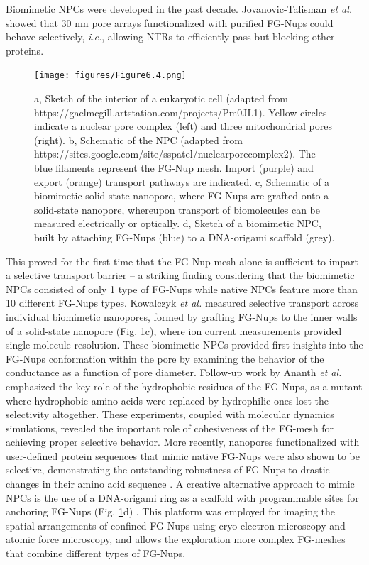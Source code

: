 Biomimetic NPCs were developed in the past decade. Jovanovic-Talisman \emph{et al.} \cite{Jovanovic-Talisman2009} showed that 30 nm pore arrays functionalized with purified FG-Nups could behave selectively, \emph{i.e.}, allowing NTRs to efficiently pass but blocking other proteins. 
\begin{figure}[!htbp]
	\centering
	\texttt{[image: figures/Figure6.4.png]}
	\caption{a, Sketch of the interior of a eukaryotic cell (adapted from https://gaelmcgill.artstation.com/projects/Pm0JL1). Yellow circles indicate a nuclear pore complex (left) and three mitochondrial pores (right). b, Schematic of the NPC (adapted from https://sites.google.com/site/sspatel/nuclearporecomplex2). The blue filaments represent the FG-Nup mesh. Import (purple) and export (orange) transport pathways are indicated. c, Schematic of a biomimetic solid-state nanopore, where FG-Nups are grafted onto a solid-state nanopore, whereupon transport of biomolecules can be measured electrically or optically. d, Sketch of a biomimetic NPC, built by attaching FG-Nups (blue) to a DNA-origami scaffold (grey).}
	\label{fig:fig6.4}
\end{figure}
This proved for the first time that the FG-Nup mesh alone is sufficient to impart a selective transport barrier – a striking finding considering that the biomimetic NPCs consisted of only 1 type of FG-Nups while native NPCs feature more than 10 different FG-Nups types. Kowalczyk \emph{et al.} \cite{Kowalczyk2011a} measured selective transport across individual biomimetic nanopores, formed by grafting FG-Nups to the inner walls of a solid-state nanopore (Fig. \ref{fig:fig6.4}c), where ion current measurements provided single-molecule resolution. These biomimetic NPCs provided first insights into the FG-Nups conformation within the pore by examining the behavior of the conductance as a function of pore diameter. Follow-up work by Ananth \emph{et al.} \cite{Ananth2018} emphasized the key role of the hydrophobic residues of the FG-Nups, as a mutant where hydrophobic amino acids were replaced by hydrophilic ones lost the selectivity altogether. These experiments, coupled with molecular dynamics simulations, revealed the important role of cohesiveness of the FG-mesh for achieving proper selective behavior. More recently, nanopores functionalized with user-defined protein sequences that mimic native FG-Nups were also shown to be selective, demonstrating the outstanding robustness of FG-Nups to drastic changes in their amino acid sequence \cite{Fragasso2021}. A creative alternative approach to mimic NPCs is the use of a DNA-origami ring as a scaffold with programmable sites for anchoring FG-Nups (Fig. \ref{fig:fig6.4}d) \cite{Ketterer2018,Fisher2018}. This platform was employed for imaging the spatial arrangements of confined FG-Nups using cryo-electron microscopy and atomic force microscopy, and allows the exploration more complex FG-meshes that combine different types of FG-Nups. 



